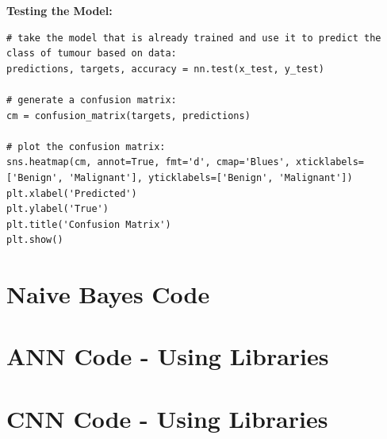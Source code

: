 \documentclass[a4paper]{article}
\begin{document}
\newpage
\textbf{Testing the Model:}
\begin{lstlisting}[basicstyle= \scriptsize]
# take the model that is already trained and use it to predict the class of tumour based on data:
predictions, targets, accuracy = nn.test(x_test, y_test)

# generate a confusion matrix:
cm = confusion_matrix(targets, predictions)

# plot the confusion matrix:
sns.heatmap(cm, annot=True, fmt='d', cmap='Blues', xticklabels=['Benign', 'Malignant'], yticklabels=['Benign', 'Malignant'])
plt.xlabel('Predicted')
plt.ylabel('True')
plt.title('Confusion Matrix')
plt.show()
\end{lstlisting}

\newpage
\section{Naive Bayes Code}

\newpage
\section{ANN Code - Using Libraries}

\newpage
\section{CNN Code - Using Libraries}
\end{document}
